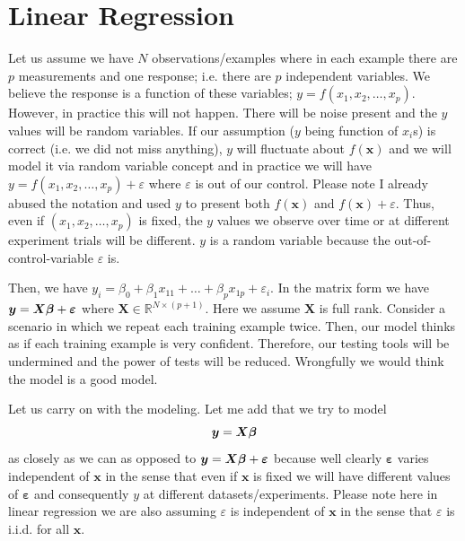 \section{Linear Regression}
\label{sec:Linear_Regression}

Let us assume we have $N$ observations/examples
where in each example there are $p$ measurements and one
response; i.e. there are $p$ independent variables.
We believe the response is a function of these variables; 
$y = f(x_1, x_2, \dots, x_p)$. However, in practice
this will not happen. There will be noise present and 
the $y$ values will be random variables. 
If our assumption ($y$ being function of
$x_i$s) is correct (i.e. we did not miss anything), 
$y$ will fluctuate about $f(\bm x)$ and we will model it via random 
variable concept and in practice we will have 
$y = f(x_1, x_2, \dots, x_p) + \varepsilon$ where $\varepsilon$
is out of our control. Please note I already abused the notation
and used $y$ to present both $f(\bm x)$ and $f(\bm x) + \varepsilon$.
Thus, even if $(x_1, x_2, \dots, x_p)$ is fixed, the $y$ values we
observe over time or at different experiment trials will be
different. $y$ is a random variable because the out-of-control-variable
$\varepsilon$ is.

Then, we have $y_i = \beta_0 + \beta_1x_{11} + \dots + \beta_p x_{1p} + \varepsilon_i$.
In the matrix form we have $\bm y = \bm X \bm \beta+ {\bm \varepsilon}$
where $\bm X \in \mathbb{R}^{N \times (p+1)}$. Here we assume
$\bm X$ is full rank. Consider a scenario in which we
repeat each training example twice. Then, our model
thinks as if each training example is very confident.
Therefore, our testing tools will be undermined and the
power of tests will be reduced. Wrongfully we would think
the model is a good model.

Let us carry on with the modeling. Let me add that
we try to model 
\begin{equation}\label{eq:overDeterminedSystem}
{\bm y} = {\bm X} \bm \beta
\end{equation}
 as closely as we can
as opposed to ${\bm y} = {\bm X} \bm \beta + {\bm \varepsilon}$ because
well clearly $\bm \varepsilon$ varies independent of 
$\bm x$ in the sense that even if $\bm x$ is fixed
we will have different values of $\bm \varepsilon$ and
consequently $y$ at different datasets/experiments.
Please note here in linear regression we are also assuming 
$\varepsilon$ is independent of $\bm x$ in the sense that
$\varepsilon$ is i.i.d. for all $\bm x$.

